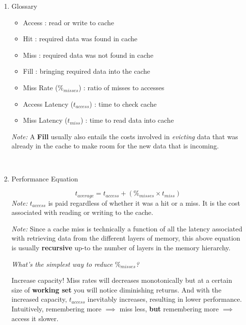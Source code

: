 \documentclass[12pt]{article}
\newenvironment{QandA}{\begin{enumerate}[label=\bfseries\arabic*.]\bfseries}
                      {\end{enumerate}}
\newenvironment{answered}{\par\quad\normalfont}{}
\begin{document}
\begin{QandA}
\ 

\item Glossary
\begin{answered}
\vspace{-0.85cm}
\begin{itemize}
    \item Access : read or write to cache
    \item Hit : required data was found in cache
    \item Miss : required data was not found in cache
    \item Fill : bringing required data into the cache
    \item Miss Rate ($\%_{misses}$) : ratio of misses to accesses
    \item Access Latency ($t_{access}$) : time to check cache
    \item Miss Latency ($t_{miss}$) : time to read data into cache
\end{itemize}
\textit{Note:} A \textbf{Fill} usually also entails the costs involved in \textit{evicting} data that was already in the cache to make room for the new data that is incoming. 
\end{answered}

\ 

\item Performance Equation
\begin{answered}
\vspace{-0.45cm}
\begin{equation}
    t_{average} = t_{access} + (\%_{misses} \times t_{miss})
\end{equation}
\textit{Note:} $t_{access}$ is paid regardless of whether it was a hit or a miss. It is the cost associated with reading or writing to the cache.

\textit{Note:} Since a cache miss is technically a function of all the latency associated with retrieving data from the different layers of memory, this above equation is usually \textbf{recursive} up-to the number of layers in the memory hierarchy.

\textit{What's the simplest way to reduce $\%_{misses}$?}

\quad Increase capacity! Miss rates will decreases monotonically but at a certain size of \textbf{working set} you will notice diminishing returns. And with the increased capacity, $t_{access}$ inevitably increases, resulting in lower performance. Intuitively, remembering more $\implies$ miss less, \textbf{but} remembering more $\implies$ access it slower.


\end{answered}
\end{QandA}
\end{document}
